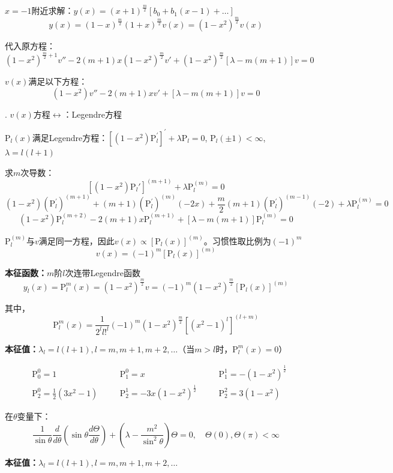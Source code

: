 $x=-1$附近求解：$y(x)=(x+1)^{\frac m2}[b_0+b_1(x-1)+\dots]$
$$y(x)=(1-x)^{\frac{m}{2}}(1+x)^{\frac{m}{2}}v(x)=(1-x^{2})^{\frac{m}{2}}v(x)$$

代入原方程：
$$(1-x^{2})^{\frac{m}{2}+1}v''-2(m+1)x(1-x^{2})^{\frac{m}{2}}v'+(1-x^{2})^{\frac{m}{2}}[\lambda-m(m+1)]v=0$$

$v(x)$满足以下方程：
$$(1-x^{2})v''-2(m+1)xv'+[\lambda-m(m+1)]v=0$$

. $v(x)$方程$\leftrightarrow$：Legendre方程

$\mathrm{P}_l(x)$满足Legendre方程：$[(1-x^{2})\mathrm{P}_{l}^{\prime}]^{\prime}+\lambda \mathrm{P}_{l}=0$, $\mathrm{P}_l(\pm1)<\infty$, $\lambda=l(l+1)$

求$m$次导数：
$$[(1-x^{2})\mathrm{P}_{l}']^{(m+1)}+\lambda \mathrm{P}_{l}^{(m)}=0$$
$$(1-x^{2})(\mathrm{P}_{l}^{\prime})^{(m+1)}+(m+1)(\mathrm{P}_{l}^{\prime})^{(m)}(-2x)+\frac{m}{2}(m+1)(\mathrm{P}_{l}^{\prime})^{(m-1)}(-2)+\lambda \mathrm{P}_{l}^{(m)}=0$$
$$(1-x^{2})\mathrm{P}_{l}^{(m+2)}-2(m+1)x\mathrm{P}_{l}^{(m+1)}+[\lambda-m(m+1)]\mathrm{P}_{l}^{(m)}=0$$

$\mathrm{P}_{l}^{(m)}$与$v$满足同一方程，因此$v(x)\propto [\mathrm{P}_{l}(x)]^{(m)}$。习惯性取比例为$(-1)^{m}$
$$v(x)=(-1)^{m}[\mathrm{P}_{l}(x)]^{(m)}$$

\textbf{本征函数：}$m$阶$l$次连带Legendre函数
$$\boxed{y_{l}(x)=\mathrm{P}_{l}^{m}(x)=(1-x^{2})^{\frac{m}{2}}v=(-1)^{m}(1-x^{2})^{\frac{m}{2}}[\mathrm{P}_{l}(x)]^{(m)}}$$

其中，
$$\mathrm{P}_{l}^{m}(x)=\frac{1}{2^{l}l!^{l}}(-1)^{m}(1-x^{2})^{\frac{m}{2}}[(x^{2}-1)^{l}]^{(l+m)}$$

\textbf{本征值：}$\lambda_l=l(l+1),l=m,m+1,m+2,\dots$（当$m>l$时，$\mathrm{P}_{l}^{m}(x)=0$）

$$
\begin{alignedat}{3}
    &\mathrm{P}_0^0=1\quad    &&\mathrm{P}_1^0=x\quad    &&\mathrm{P}_1^1=-(1-x^2)^{\frac{1}{2}}\\
    &\mathrm{P}_2^0=\frac{1}{2}(3x^2-1)\quad&&\mathrm{P}_2^1=-3x(1-x^2)^{\frac{1}{2}}\quad&&\mathrm{P}_2^2=3(1-x^2)
\end{alignedat}
$$

\noindent 在$\theta$变量下：
$$\frac{1}{\sin\theta}\frac{d}{d\theta}\left(\sin\theta\frac{d\Theta}{d\theta}\right)+\left(\lambda-\frac{m^2}{\sin^2\theta}\right)\Theta=0,\quad \Theta(0),\Theta(\pi)<\infty$$

\textbf{本征值：}$\lambda_l=l(l+1),l=m,m+1,m+2,\dots$

